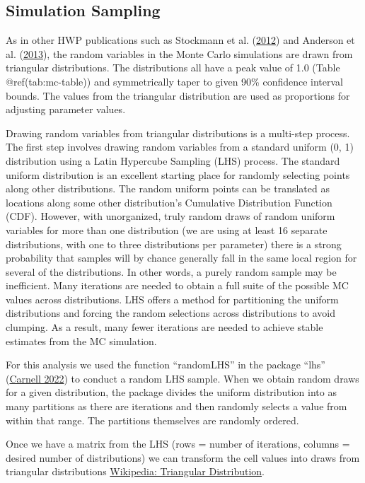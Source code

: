 \documentclass[
  openany]{book}
\begin{document}
\hypertarget{model-mc-samp}{%
\subsection{Simulation Sampling}\label{model-mc-samp}}

As in other HWP publications such as Stockmann et al.
(\protect\hyperlink{ref-stockmann2012}{2012}) and Anderson et al.
(\protect\hyperlink{ref-anderson2013}{2013}), the random variables in
the Monte Carlo simulations are drawn from triangular distributions. The
distributions all have a peak value of 1.0 (Table @ref(tab:mc-table))
and symmetrically taper to given 90\% confidence interval bounds. The
values from the triangular distribution are used as proportions for
adjusting parameter values.

Drawing random variables from triangular distributions is a multi-step
process. The first step involves drawing random variables from a
standard uniform (0, 1) distribution using a Latin Hypercube Sampling
(LHS) process. The standard uniform distribution is an excellent
starting place for randomly selecting points along other distributions.
The random uniform points can be translated as locations along some
other distribution's Cumulative Distribution Function (CDF). However,
with unorganized, truly random draws of random uniform variables for
more than one distribution (we are using at least 16 separate
distributions, with one to three distributions per parameter) there is a
strong probability that samples will by chance generally fall in the
same local region for several of the distributions. In other words, a
purely random sample may be inefficient. Many iterations are needed to
obtain a full suite of the possible MC values across distributions. LHS
offers a method for partitioning the uniform distributions and forcing
the random selections across distributions to avoid clumping. As a
result, many fewer iterations are needed to achieve stable estimates
from the MC simulation.

For this analysis we used the function ``randomLHS'' in the package
``lhs'' (\protect\hyperlink{ref-R-lhs}{Carnell 2022}) to conduct a
random LHS sample. When we obtain random draws for a given distribution,
the package divides the uniform distribution into as many partitions as
there are iterations and then randomly selects a value from within that
range. The partitions themselves are randomly ordered.

Once we have a matrix from the LHS (rows = number of iterations, columns
= desired number of distributions) we can transform the cell values into
draws from triangular distributions
\href{https://en.wikipedia.org/wiki/Triangular_distribution}{Wikipedia:
Triangular Distribution}.
\end{document}
